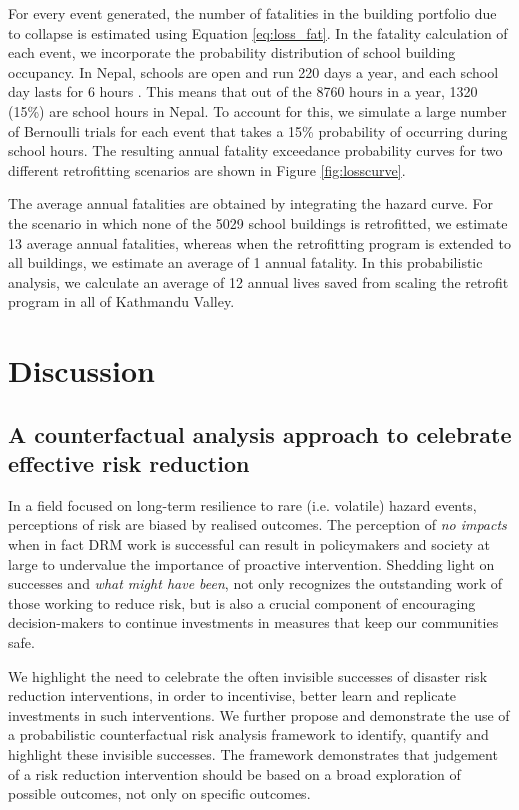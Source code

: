 \documentclass[utf8]{frontiersSCNS} %
\begin{document}
For every event generated, the number of fatalities in the building portfolio due to collapse is estimated using Equation \ref{eq:loss_fat}. In the fatality calculation of each event, we incorporate the probability distribution of school building occupancy. In Nepal, schools are open and run 220 days a year, and each school day lasts for 6 hours \citep{nepal2009reform}. This means that out of the 8760 hours in a year, 1320 (15\%) are school hours in Nepal. To account for this, we simulate a large number of Bernoulli trials for each event that takes a 15\% probability of occurring during school hours. The resulting annual fatality exceedance probability curves for two different retrofitting scenarios are shown in Figure \ref{fig:losscurve}. 

The average annual fatalities are obtained by integrating the hazard curve. For the scenario in which none of the 5029 school buildings is retrofitted, we estimate 13 average annual fatalities, whereas when the retrofitting program is extended to all buildings, we estimate an average of 1 annual fatality. In this probabilistic analysis, we calculate an average of 12 annual lives saved from scaling the retrofit program in all of Kathmandu Valley.
\section{Discussion}
\label{section-discussion}

\subsection{A counterfactual analysis approach to celebrate effective risk reduction}

In a field focused on long-term resilience to rare (i.e. volatile) hazard events, perceptions of risk are biased by realised outcomes. The perception of \textit{no impacts} when in fact DRM work is successful can result in policymakers and society at large to undervalue the importance of proactive intervention. Shedding light on successes and \textit{what might have been}, not only recognizes the outstanding work of those working to reduce risk, but is also a crucial component of encouraging decision-makers to continue investments in measures that keep our communities safe. 

We highlight the need to celebrate the often invisible successes of disaster risk reduction interventions, in order to incentivise, better learn and replicate investments in such interventions. We further propose and demonstrate the use of a probabilistic counterfactual risk analysis framework to identify, quantify and highlight these invisible successes. The framework demonstrates that judgement of a risk reduction intervention should be based on a broad exploration of possible outcomes, not only on specific outcomes.
\end{document}
